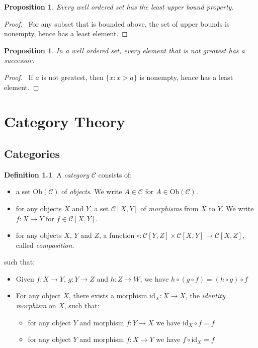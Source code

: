 \documentclass{book}
\let\qed\relax
\newtheorem{prop}[ax]{Proposition}
\theoremstyle{definition}
\newtheorem{df}[ax]{Definition}
\newcommand{\id}[1]{\ensuremath{\mathrm{id}_{#1}}}
\newcommand{\Ob}[1]{\ensuremath{\mathrm{Ob} \left( {#1} \right)}}
\begin{document}
\begin{prop}
Every well ordered set has the least upper bound property.
\end{prop}

\begin{proof}
\pf\ For any subset that is bounded above, the set of upper bounds is nonempty, hence has a least element. \qed
\end{proof}

\begin{prop}
In a well ordered set, every element that is not greatest has a successor.
\end{prop}

\begin{proof}
\pf\ If $a$ is not greatest, then $\{ x : x > a \}$ is nonempty, hence has a least element. \qed
\end{proof}

\chapter{Category Theory}

\section{Categories}

\begin{df}
A \emph{category} $\mathcal{C}$ consists of:
\begin{itemize}
\item a set $\Ob{\mathcal{C}}$ of \emph{objects}. We write $A \in \mathcal{C}$ for $A \in \Ob{\mathcal{C}}$.
\item for any objects $X$ and $Y$, a set $\mathcal{C}[X,Y]$ of \emph{morphisms} from $X$ to $Y$. We write $f : X \rightarrow Y$ for $f \in \mathcal{C}[X,Y]$.
\item for any objects $X$, $Y$ and $Z$, a function $\circ : \mathcal{C}[Y,Z] \times \mathcal{C}[X,Y] \rightarrow \mathcal{C}[X,Z]$, called \emph{composition}.
\end{itemize}
such that:
\begin{itemize}
\item Given $f : X \rightarrow Y$, $g : Y \rightarrow Z$ and $h : Z \rightarrow W$, we have $h \circ (g \circ f) = (h \circ g) \circ f$
\item For any object $X$, there exists a morphism $\id{X} : X \rightarrow X$, the \emph{identity morphism} on $X$, such that:
\begin{itemize}
\item for any object $Y$ and morphism $f : Y \rightarrow X$ we have $\id{X} \circ f = f$
\item for any object $Y$ and morphism $f : X \rightarrow Y$ we have $f \circ \id{X} = f$
\end{itemize} 
\end{itemize}
\end{df}
\end{document}
